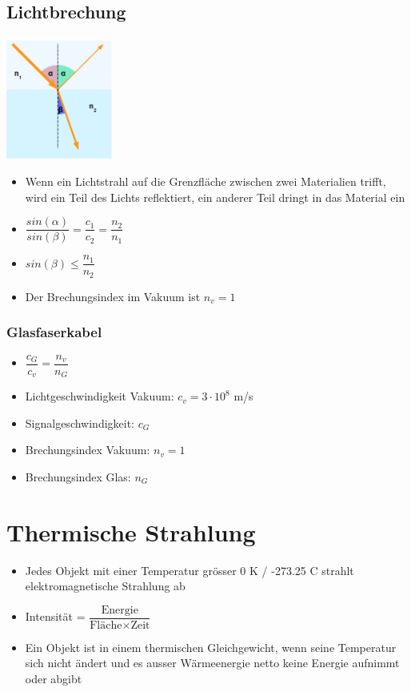 \documentclass[8pt,a4paper]{scrartcl}
\begin{document}
\begin{multicols*}{3}
				\subsection{Lichtbrechung}
					\includegraphics[height=4cm]{img/brechung.png} 
					\begin{itemize}\itemsep0pt
						\item Wenn ein Lichtstrahl auf die Grenzfläche zwischen zwei Materialien trifft, wird ein Teil des Lichts reflektiert, ein anderer Teil dringt in das Material ein
						\item $\dfrac{sin(\alpha)}{sin(\beta)}=\dfrac{c_{1}}{c_{2}}=\dfrac{n_{2}}{n_{1}}$
						\item $sin(\beta)\leq \dfrac{n_{1}}{n_{2}}$
						\item Der Brechungsindex im Vakuum ist $n_{v} = 1$
					\end{itemize}	
					
					
					\subsubsection{Glasfaserkabel}
						\begin{itemize}\itemsep0pt
							\item $\dfrac{c_{G}}{c_{v}}=\dfrac{n_{v}}{n_{G}}$
							\item Lichtgeschwindigkeit Vakuum: $c_{v} = 3\cdot 10^{8}$ m/s 
							\item Signalgeschwindigkeit: $c_{G}$
							\item Brechungsindex Vakuum: $n_{v} = 1$ 
							\item Brechungsindex Glas: $n_{G}$ 
						\end{itemize}	
						
				\section{Thermische Strahlung}
					\begin{itemize}\itemsep0pt
						\item Jedes Objekt mit einer Temperatur grösser 0 K / -273.25 C strahlt elektromagnetische Strahlung ab
						\item Intensität = $\dfrac{\text{Energie}}{\text{Fläche} \times \text{Zeit}}$
						\item Ein Objekt ist in einem thermischen Gleichgewicht, wenn seine Temperatur sich nicht ändert und es ausser Wärmeenergie netto keine Energie aufnimmt oder abgibt
					\end{itemize}
					

\end{multicols*}
\end{document}

